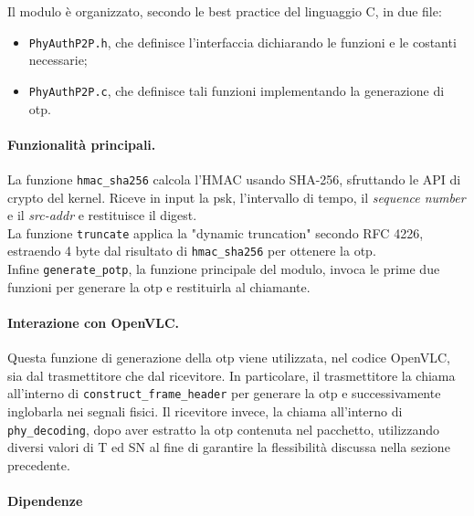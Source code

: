 \noindent Il modulo è organizzato, secondo le best practice del linguaggio C, in due file:
\begin{itemize}
    \item \texttt{PhyAuthP2P.h}, che definisce l'interfaccia dichiarando le funzioni e le costanti necessarie;
    \item \texttt{PhyAuthP2P.c}, che definisce tali funzioni implementando la generazione di \gls{otp}.
\end{itemize}


\paragraph{Funzionalità principali.}
La funzione \texttt{hmac\_sha256} calcola l'HMAC usando SHA-256, sfruttando le API di crypto del kernel. Riceve in input la \gls{psk}, l'intervallo di tempo, il \textit{sequence number} e il \textit{src-addr} e restituisce il digest.\\
La funzione \texttt{truncate} applica la "dynamic truncation" secondo RFC 4226, estraendo 4 byte dal risultato di \texttt{hmac\_sha256} per ottenere la \gls{otp}.\\
Infine \texttt{generate\_potp}, la funzione principale del modulo, invoca le prime due funzioni per generare la \gls{otp} e restituirla al chiamante.

\paragraph{Interazione con OpenVLC.}
Questa funzione di generazione della \gls{otp} viene utilizzata, nel codice OpenVLC, sia dal trasmettitore che dal ricevitore.
In particolare, il trasmettitore la chiama all'interno di \texttt{construct\_frame\_header} per generare la \gls{otp} e successivamente inglobarla nei segnali fisici. Il ricevitore invece, la chiama all'interno di \texttt{phy\_decoding}, dopo aver estratto la \gls{otp} contenuta nel pacchetto, utilizzando diversi valori di T ed SN al fine di garantire la flessibilità discussa nella sezione precedente.

\paragraph{Dipendenze}


